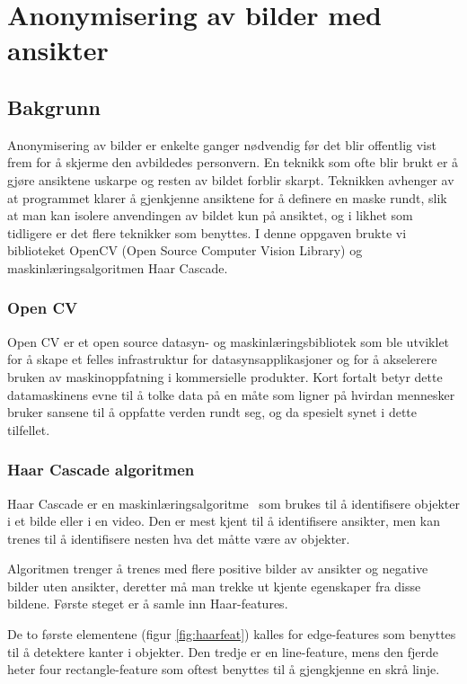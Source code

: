 \newpage
\section{Anonymisering av bilder med ansikter}
\label{sec:Anonymisering}
\subsection{Bakgrunn}
Anonymisering av bilder er enkelte ganger nødvendig før det blir offentlig vist frem for å skjerme den avbildedes personvern. En teknikk som ofte blir brukt er å gjøre ansiktene uskarpe og resten av bildet forblir skarpt. Teknikken avhenger av at programmet klarer å gjenkjenne ansiktene\cite{wiki:FaceDetection} for å definere en maske rundt, slik at man kan isolere anvendingen av bildet kun på ansiktet, og i likhet som tidligere er det flere teknikker som benyttes. I denne oppgaven brukte vi biblioteket OpenCV (Open Source Computer Vision Library) og maskinlæringsalgoritmen Haar Cascade. 

\subsubsection{Open CV}
Open CV er et open source datasyn-\cite{datasyn} og maskinlæringsbibliotek som ble utviklet for å skape et felles infrastruktur for datasynsapplikasjoner og for å akselerere bruken av maskinoppfatning i kommersielle produkter\cite{cv2}. Kort fortalt betyr dette datamaskinens evne til å tolke data på en måte som ligner på hvirdan mennesker bruker sansene til å oppfatte verden rundt seg\cite{wiki:machinePerception}, og da spesielt synet i dette tilfellet.  

\subsubsection{Haar Cascade algoritmen}
Haar Cascade er en maskinlæringsalgoritme~\cite{haar} som brukes til å identifisere objekter i et bilde eller i en video. Den er mest kjent til å identifisere ansikter, men kan trenes til å identifisere nesten hva det måtte være av objekter.

Algoritmen trenger å trenes med flere positive bilder av ansikter og negative bilder uten ansikter, deretter må man trekke ut kjente egenskaper fra disse bildene. Første steget er å samle inn Haar-features. 

De to første elementene (figur \ref{fig:haarfeat}) kalles for edge-features som benyttes til å detektere kanter i objekter. Den tredje er en line-feature, mens den fjerde heter four rectangle-feature som oftest benyttes til å gjengkjenne en skrå linje.

